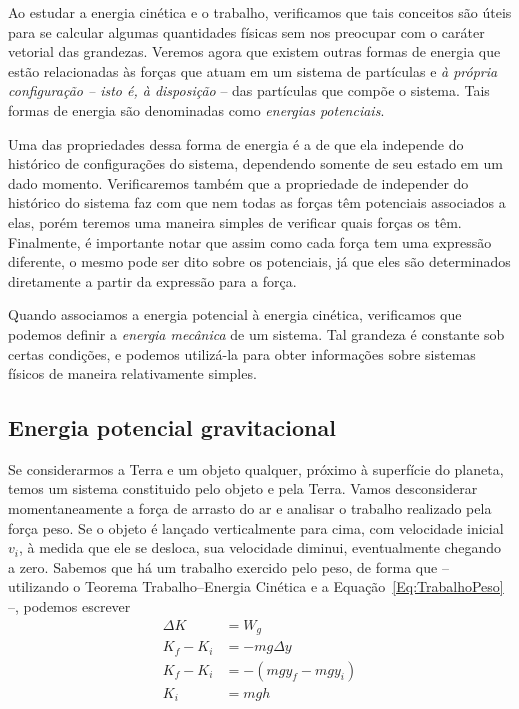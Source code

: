 Ao estudar a energia cinética e o trabalho, verificamos que tais conceitos são úteis para se calcular algumas quantidades físicas sem nos preocupar com o caráter vetorial das grandezas. Veremos agora que existem outras formas de energia que estão relacionadas às forças que atuam em um sistema de partículas e \emph{à própria configuração -- isto é, à disposição} -- das partículas que compõe o sistema. Tais formas de energia são denominadas como \emph{energias potenciais}.

Uma das propriedades dessa forma de energia é a de que ela independe do histórico de configurações do sistema, dependendo somente de seu estado em um dado momento. Verificaremos também que a propriedade de independer do histórico do sistema faz com que nem todas as forças têm potenciais associados a elas, porém teremos uma maneira simples de verificar quais forças os têm. Finalmente, é importante notar que assim como cada força tem uma expressão diferente, o mesmo pode ser dito sobre os potenciais, já que eles são determinados diretamente a partir da expressão para a força.

Quando associamos a energia potencial à energia cinética, verificamos que podemos definir a \emph{energia mecânica} de um sistema. Tal grandeza é constante sob certas condições, e podemos utilizá-la para obter informações sobre sistemas físicos de maneira relativamente simples.

\subsection{Energia potencial gravitacional}

Se considerarmos a Terra e um objeto qualquer, próximo à superfície do planeta, temos um sistema constituido pelo objeto e pela Terra. Vamos desconsiderar momentaneamente a força de arrasto do ar e analisar o trabalho realizado pela força peso. Se o objeto é lançado verticalmente para cima, com velocidade inicial $v_i$, à medida que ele se desloca, sua velocidade diminui, eventualmente chegando a zero. Sabemos que há um trabalho exercido pelo peso, de forma que -- utilizando o Teorema Trabalho--Energia Cinética e a Equação~\ref{Eq:TrabalhoPeso} --, podemos escrever
\begin{align}
  \Delta K &= W_g \\
  K_f - K_i &=  -mg\Delta y \\
  K_f - K_i &=  -(mgy_f - mgy_i) \\
  K_i &= mgh
\end{align}

